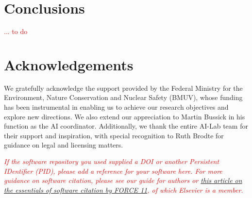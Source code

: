 \documentclass[preprint,12pt, a4paper]{elsarticle}
\begin{document}
\section{Conclusions}
\textcolor{red}{... to do}

\section*{Acknowledgements}
We gratefully acknowledge the support provided by the Federal Ministry for the Environment, Nature Conservation and Nuclear Safety (BMUV), whose funding has been instrumental in enabling us to achieve our research objectives and explore new directions. 
We also extend our appreciation to Martin Bussick in his function as the AI coordinator. 
Additionally, we thank the entire AI-Lab team for their support and inspiration, with special recognition to Ruth Brodte for guidance on legal and licensing matters.

 



\textcolor{red}{
\textit{If the software repository you used supplied a DOI or another
Persistent IDentifier (PID), please add a reference for your software
here. For more guidance on software citation, please see our guide for
authors or \href{https://f1000research.com/articles/9-1257/v2}{this
  article on the essentials of software citation by FORCE 11}, of
which Elsevier is a member.}
}
\end{document}
